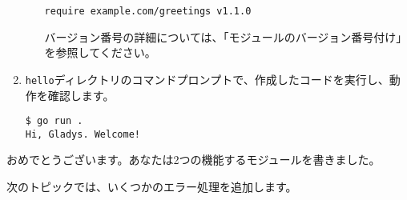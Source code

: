 \begin{enumerate}
\begin{enumerate}
\begin{lstlisting}[numbers=none]
require example.com/greetings v1.1.0
\end{lstlisting}


バージョン番号の詳細については、「モジュールのバージョン番号付け」を参照してください。
\end{enumerate}

\item \texttt{hello}ディレクトリのコマンドプロンプトで、作成したコードを実行し、動作を確認します。


\begin{lstlisting}[numbers=none]
$ go run .
Hi, Gladys. Welcome!
\end{lstlisting}

\end{enumerate}


おめでとうございます。あなたは2つの機能するモジュールを書きました。

次のトピックでは、いくつかのエラー処理を追加します。



